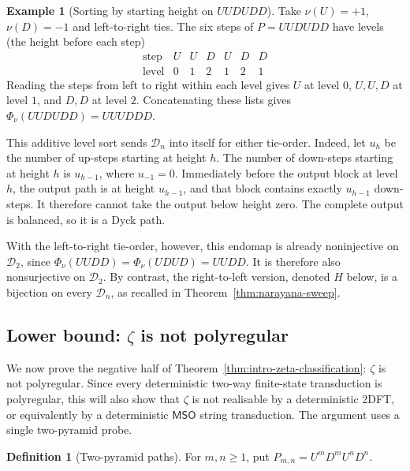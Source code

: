 \documentclass[11pt]{article}
\theoremstyle{definition}
\newtheorem{definition}[theorem]{Definition}
\newtheorem{example}[theorem]{Example}
\newcommand{\D}{\mathcal D}
\newcommand{\MSO}{\mathsf{MSO}}
\begin{document}
\begin{example}[Sorting by starting height on $UUDUDD$]\label{ex:height-sweep}
Take $\nu(U)=+1$, $\nu(D)=-1$ and left-to-right ties.  The six steps of
$P=UUDUDD$ have levels (the height before each step)
\[
   \begin{array}{c|cccccc}
     \text{step}  & U & U & D & U & D & D\\\hline
     \text{level} & 0 & 1 & 2 & 1 & 2 & 1
   \end{array}
\]
Reading the steps from left to right within each level gives $U$ at level $0$,
$U,U,D$ at level $1$, and $D,D$ at level $2$.  Concatenating these lists gives
$\Phi_\nu(UUDUDD)=UUUDDD$.

This additive level sort sends $\D_n$ into itself for either tie-order.
Indeed, let $u_h$ be the number of up-steps starting at height $h$.  The number of
down-steps starting at height $h$ is $u_{h-1}$, where $u_{-1}=0$.  Immediately
before the output block at level $h$, the output path is at height $u_{h-1}$,
and that block contains exactly $u_{h-1}$ down-steps.  It therefore cannot take
the output below height zero.  The complete output is balanced, so it is a
Dyck path.

With the left-to-right tie-order, however, this endomap is already
noninjective on $\D_2$, since
$\Phi_\nu(UUDD)=\Phi_\nu(UDUD)=UUDD$.
It is therefore also nonsurjective on $\D_2$.  By contrast, the right-to-left
version, denoted $H$ below, is a bijection on every $\D_n$, as recalled in
Theorem~\ref{thm:narayana-sweep}.
\end{example}

\subsection[Lower bound: zeta is not polyregular]{Lower bound: $\zeta$ is not polyregular}\label{sec:zeta-not-polyregular}

We now prove the negative half of Theorem~\ref{thm:intro-zeta-classification}:
$\zeta$ is not polyregular.  Since every deterministic two-way finite-state
transduction is polyregular, this will also show that $\zeta$ is not realisable
by a deterministic 2DFT, or equivalently by a deterministic $\MSO$ string
transduction.  The argument uses a single two-pyramid probe.

\begin{definition}[Two-pyramid paths]
For $m,n\ge 1$, put $P_{m,n}=U^m D^m U^n D^n$.
\end{definition}
\end{document}
